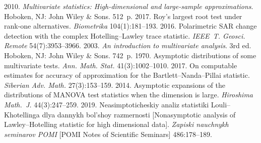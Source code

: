 




\vspace*{12pt}

  \begin{multicols}{2}

\renewcommand{\bibname}{\protect\rmfamily References}

{\small\frenchspacing
 {%
 \begin{thebibliography}{99}
 2010. 
\textit{Multivariate statistics: High-dimensional and large-sample approximations}.
 Hoboken, NJ: John Wiley \& Sons. 512~p.
 2017. Roy's largest root test under rank-one 
alternatives. \textit{Biometrika} 104(1):181--193.
 2016. Polarimetric SAR change detection with the complex Hotelling--Lawley trace statistic. 
 \textit{IEEE~T. Geosci. Remote} 54(7):3953--3966.
 2003. \textit{An introduction to multivariate analysis}. 
3rd ed. Hoboken, NJ: John Wiley \& Sons. 742~p.
 1970. Asymptotic distributions of some multivariate tests. 
\textit{Ann. Math. Stat.} 41(3):1002--1010.
 2017. On computable estimates for accuracy of approximation
 for the Bartlett--Nanda--Pillai statistic. \textit{Siberian Adv. Math.} 27(3):153--159.
 2014. Asymptotic expansions of the distributions 
of MANOVA test statistics when the dimension is large. \textit{Hiroshima Math.~J.} 44(3):247--259.
 2019. Neasimptoticheskiy analiz statistiki Louli--Khotellinga dlya dannykh bol'shoy razmernosti 
 [Nonasymptotic analysis of Lawley--Hotelling statistic for high dimensional data]. 
 \textit{Zapiski nauchnykh seminarov POMI} [POMI Notes of Scientific Seminars] 486:178--189.

\end{thebibliography}}}
\end{multicols}
